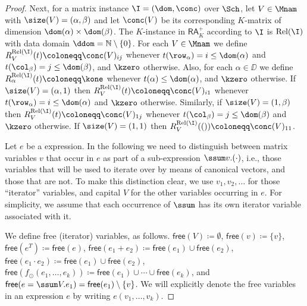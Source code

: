 \begin{proof}
Next, for a matrix instance $\I = (\dom,\conc)$ over $\Sch$,
let $V\in\Mnam$ with $\size(V)=(\alpha,\beta)$ and let $\conc(V)$ be its corresponding $K$-matrix of dimension $\dom(\alpha)\times \dom(\beta)$.
The $K$-instance in $\mathsf{RA}_{K}^+$ according to $\I$ is $\text{Rel}(\I)$ with data domain $\ddom = \mathbb{N} \setminus \{0\}$. For each $V\in\Mnam$ we define 
$R_V^{\text{Rel}(\I)}(t)\coloneqq \conc(V)_{ij}$ whenever $t(\row_\alpha) = i \leq \dom(\alpha)$ and $t(\col_\beta) = j \leq \dom(\beta)$, and $\kzero$ otherwise. 
Also, for each $\alpha \in \DD$ we define $R_\alpha^{\text{Rel}(\I)}(t)\coloneqq \kone$ whenever $t(\alpha) \leq \dom(\alpha)$, and $\kzero$ otherwise.
If $\size(V)=(\alpha,1)$ then $R_V^{\text{Rel}(\I)}(t)\coloneqq \conc(V)_{i1}$ whenever $t(\row_\alpha) = i \leq \dom(\alpha)$ and $\kzero$ otherwise.
Similarly, if $\size(V)=(1,\beta)$ then $R_V^{\text{Rel}(\I)}(t)\coloneqq \conc(V)_{1j}$ whenever $t(\col_\beta) = j \leq \dom(\beta)$ and $\kzero$ otherwise.
If $\size(V)=(1,1)$ then $R_V^{\text{Rel}(\I)}(())\coloneqq \conc(V)_{11}$.


Let $e$ be a \langsum expression. In the following we need to distinguish between matrix variables $v$
that occur in $e$ as part of a sub-expression $\ssum v. (\cdot)$, i.e., those variables that will be used to iterate over by means of canonical vectors, and those that are not. To make this distinction clear, we use $v_1,v_2,\ldots$ for those ``iterator'' variables, and capital $V$ for the other variables occurring in $e$. For simplicity, we assume that each occurrence of $\ssum$ has its own iterator variable associated with it. 

We define free (iterator) variables, as follows.
$\mathsf{free}(V)\coloneqq \emptyset$, $\mathsf{free}(v)\coloneqq \{v\}$, $\mathsf{free}(e^T)\coloneqq \mathsf{free}(e)$, $\mathsf{free}(e_1+e_2)\coloneqq \mathsf{free}(e_1)\cup \mathsf{free}(e_2)$, $\mathsf{free}(e_1\cdot e_2)\coloneqq \mathsf{free}(e_1)\cup \mathsf{free}(e_2)$,
 $\mathsf{free}(f_\odot(e_1,\ldots,e_k))\coloneqq \mathsf{free}(e_1)\cup\cdots \cup \mathsf{free}(e_k)$, and $\mathsf{free}(e=\ssum V. e_1)=\mathsf{free}(e_1)\setminus\{v\}$. We will explicitly denote the free variables in an expression $e$ by writing $e(v_1,\ldots,v_k)$.


\end{proof}
